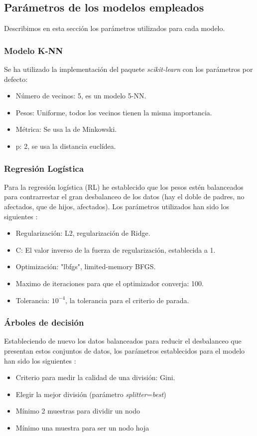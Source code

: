 \subsection{Parámetros de los modelos empleados}
Describimos en esta sección los parámetros utilizados para cada modelo.
\subsubsection{Modelo K-NN}
Se ha utilizado la implementación del paquete \textit{scikit-learn} \cite{scikit2021knn} con los parámetros por defecto:
\begin{itemize}
\itemsep 0em 
  \item Número de vecinos: 5, es un modelo 5-NN.
  \item Pesos: Uniforme, todos los vecinos tienen la misma importancia.
  \item Métrica: Se usa la de Minkowski.
  \item p: 2, se usa la distancia euclídea.
\end{itemize}


\subsubsection{Regresión Logística}
Para la regresión logística (RL) he establecido que los pesos estén balanceados para contrarrestar el gran desbalanceo de los datos (hay el doble de padres, no afectados, que de hijos, afectados). Los parámetros utilizados han sido los siguientes \cite{scikit2021lr}:
\begin{itemize}
\itemsep 0em 
  \item Regularización: L2, regularización de Ridge.
  \item C: El valor inverso de la fuerza de regularización, establecida a 1.
  \item Optimización: "lbfgs", limited-memory BFGS.
  \item Maximo de iteraciones para que el optimizador converja: 100.
  \item Tolerancia: $10^{-4}$, la tolerancia para el criterio de parada.
\end{itemize}

\subsubsection{Árboles de decisión}
Estableciendo de nuevo los datos balanceados para reducir el desbalanceo que presentan estos conjuntos de datos, los parámetros establecidos para el modelo han sido los siguientes \cite{scikit2021dt}:
\begin{itemize}
\itemsep 0em 
  \item Criterio para medir la calidad de una división: Gini.
  \item Elegir la mejor división (parámetro \textit{splitter}=\textit{best})
  \item Mínimo 2 muestras para dividir un nodo
  \item Mínimo una muestra para ser un nodo hoja
\end{itemize}


